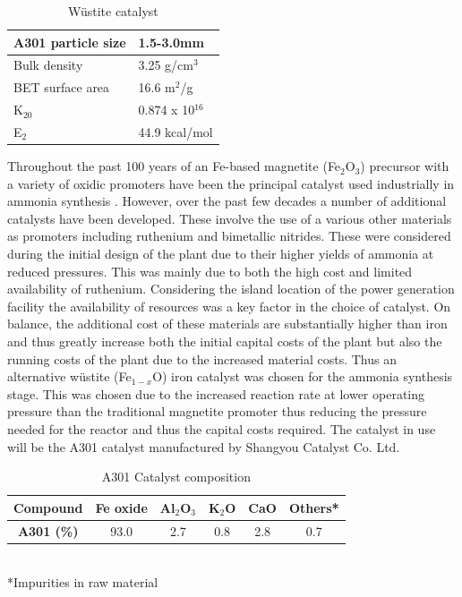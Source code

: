 \documentclass[11pt, a4paper]{article}
\begin{document}
{\begin{table}
	{\singlespacing
\centering
		\caption{W\"{u}stite catalyst \cite{Pernicone2003}}
		\begin{tabular}{ |l|l|  }
			\hline
			A301 particle size & 1.5-3.0mm\\
			\hline
			Bulk density & 3.25 g/cm$^3$\\
			\hline
			BET surface area & 16.6 m$^2$/g\\
			\hline
			K$_{20}$&  0.874 x 10$^{16}$\\
			\hline
			E$_2$ &44.9 kcal/mol \\
			\hline
		\end{tabular}
}
\end{table}
Throughout the past 100 years of an Fe-based magnetite (Fe$_{2}$O$_3$) precursor with a variety of oxidic promoters have been the principal catalyst used industrially in ammonia synthesis \cite{Liu2014}. However, over the past few decades a number of additional catalysts have been developed. These involve the use of a various other materials as promoters including ruthenium and bimetallic nitrides. These were considered during the initial design of the plant due to their higher yields of ammonia at reduced pressures. This was mainly due to both the high cost and limited availability of ruthenium. Considering the island location of the power generation facility the availability of resources was a key factor in the choice of catalyst. On balance, the additional cost of these materials are substantially higher than iron and thus greatly increase both the initial capital costs of the plant but also the running costs of the plant due to the increased material costs. Thus an alternative w\"{u}stite (Fe$_{1-x}$O) iron catalyst was chosen for the ammonia synthesis stage. This was chosen due to the increased reaction rate at lower operating pressure than the traditional magnetite promoter thus reducing the pressure needed for the reactor and thus the capital costs required. The catalyst in use will be the A301 catalyst manufactured by Shangyou Catalyst Co. Ltd. 

\begin{table}[!htbp]
	\begin{center}
		\caption{A301 Catalyst composition}
		\begin{tabular}{ |c|c|c|c|c|c| }
			
			\hline
			\textbf{Compound} &Fe oxide & Al$_2$O$_3$ & K$_2$O & CaO & Others*\\
				\hline
			\textbf{A301 (\%)} &93.0 & 2.7 & 0.8 & 2.8 & 0.7\\
			\hline
		\end{tabular}
	\small
	\\
	*Impurities in raw material
	\end{center}
\end{table}

}
\end{document}
